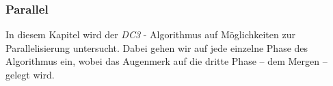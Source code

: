 \subsubsection{Parallel}
\label{dc3-parallel}

In  diesem Kapitel wird der \emph{DC3} - Algorithmus auf Möglichkeiten zur Parallelisierung untersucht. Dabei gehen wir auf jede einzelne Phase des Algorithmus ein, wobei das Augenmerk auf die dritte Phase -- dem Mergen -- gelegt wird.




